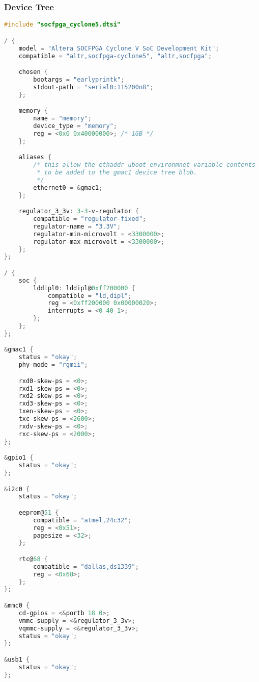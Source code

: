 \subsubsection{Device Tree}
\begin{lstlisting}[language=C]
#include "socfpga_cyclone5.dtsi"

/ {
	model = "Altera SOCFPGA Cyclone V SoC Development Kit";
	compatible = "altr,socfpga-cyclone5", "altr,socfpga";

	chosen {
		bootargs = "earlyprintk";
		stdout-path = "serial0:115200n8";
	};

	memory {
		name = "memory";
		device_type = "memory";
		reg = <0x0 0x40000000>; /* 1GB */
	};

	aliases {
		/* this allow the ethaddr uboot environmnet variable contents
		 * to be added to the gmac1 device tree blob.
		 */
		ethernet0 = &gmac1;
	};

	regulator_3_3v: 3-3-v-regulator {
		compatible = "regulator-fixed";
		regulator-name = "3.3V";
		regulator-min-microvolt = <3300000>;
		regulator-max-microvolt = <3300000>;
	};
};

/ {
	soc {
		lddipl0: lddipl@0xff200000 {
			compatible = "ld,dipl";
			reg = <0xff200000 0x00000020>;
			interrupts = <0 40 1>;
		};
	};
};

&gmac1 {
	status = "okay";
	phy-mode = "rgmii";

	rxd0-skew-ps = <0>;
	rxd1-skew-ps = <0>;
	rxd2-skew-ps = <0>;
	rxd3-skew-ps = <0>;
	txen-skew-ps = <0>;
	txc-skew-ps = <2600>;
	rxdv-skew-ps = <0>;
	rxc-skew-ps = <2000>;
};

&gpio1 {
	status = "okay";
};

&i2c0 {
	status = "okay";

	eeprom@51 {
		compatible = "atmel,24c32";
		reg = <0x51>;
		pagesize = <32>;
	};

	rtc@68 {
		compatible = "dallas,ds1339";
		reg = <0x68>;
	};
};

&mmc0 {
	cd-gpios = <&portb 18 0>;
	vmmc-supply = <&regulator_3_3v>;
	vqmmc-supply = <&regulator_3_3v>;
	status = "okay";
};

&usb1 {
	status = "okay";
};

\end{lstlisting}